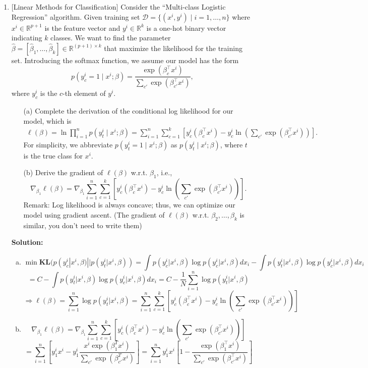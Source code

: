 \documentclass[10pt]{article}
\begin{document}
\begin{enumerate}[1.]
	\item {} [Linear Methods for Classification] 
	Consider the ``Multi-class Logistic Regression'' algorithm. Given training set 
	$\mathcal{D}=\{(x^i,y^i)\mid i=1,\ldots,n\}$ where $x^i\in \mathbb{R}^{p+1}$ is the 
	feature vector and $y^i\in \mathbb{R}^{k}$ is a one-hot binary vector indicating 
	$k$ classes. We want to find the parameter $\hat{\beta}=[\hat{\beta}_1,\ldots,\hat{\beta}_k]\in \mathbb{R}^{(p+1)\times k}$ 
	that maximize the likelihood for the training set. Introducing the softmax 
	function, we assume our model has the form 
	\[
		p(y_c^i=1\mid x^i;\beta) = \frac{\exp(\beta_c^\top x^i)}{\sum_{c'}\exp(\beta_{c'}^\top x^i)},
	\]
	where $y_c^i$ is the $c$-th element of $y^i$.
		\begin{itemize}
		\item[(a)] Complete the derivation of the conditional log likelihood for our model, which is
		\begin{align*}
			\ell(\beta) = \ln \prod_{i=1}^{n} p(y_t^i\mid x^i;\beta)
			=\sum_{i=1}^{n}\sum_{c=1}^{k}\left[ y_c^i(\beta_c^\top x^i) - y_c^i\ln \left(\sum_{c'}\exp(\beta_{c'}^\top x^i) \right)\right].
		\end{align*}
		For simplicity, we abbreviate $p(y_t^i=1\mid x^i;\beta)$ as $p(y_t^i\mid x^i;\beta)$, where 
		$t$ is the true class for $x^i$.~
		\item[(b)] Derive the gradient of $\ell(\beta)$ w.r.t. $\beta_1$, i.e., 
		\[
			\nabla_{\beta_1}\ell(\beta) = \nabla_{\beta_1} \sum_{i=1}^{n}\sum_{c=1}^{k}\left[ y_c^i(\beta_c^\top x^i) - y_c^i\ln \left(\sum_{c'}\exp(\beta_{c'}^\top x^i) \right)\right].
		\]
		Remark: Log likelihood is always concave; thus, we can optimize our model 
		using gradient ascent. (The gradient of $\ell(\beta)$ w.r.t. $\beta_2,\ldots,\beta_k$ is similar, you don't need to write them)~
		\end{itemize}
		\textbf{Solution:}
		\begin{enumerate}[(a)]
			\item 
			$$\min\mathbf{KL}(p(y_c^i|x^i,\beta)||p(y_t^i|x^i,\beta))=\int p(y_c^i|x^i,\beta)\log p(y_c^i|x^i,\beta)dx_i-\int p(y_t^i|x^i,\beta)\log p(y_c^i|x^i,\beta)dx_i$$
			$$=C-\int p(y_t^i|x^i,\beta)\log p(y_c^i|x^i,\beta)dx_i=C-\frac{1}{N}\sum_{i=1}^n\log p(y_t^i|x^i,\beta)$$
			$$\Rightarrow \ell(\beta)=\sum_{i=1}^n\log p(y_t^i|x^i,\beta)=\sum_{i=1}^{n}\sum_{c=1}^{k}\left[ y_c^i(\beta_c^\top x^i) - y_c^i\ln \left(\sum_{c'}\exp(\beta_{c'}^\top x^i) \right)\right]$$
			\item 
			$$\nabla_{\beta_1}\ell(\beta) = \nabla_{\beta_1} \sum_{i=1}^{n}\sum_{c=1}^{k}\left[ y_c^i(\beta_c^\top x^i) - y_c^i\ln \left(\sum_{c'}\exp(\beta_{c'}^\top x^i) \right)\right]$$
			$$=\sum_{i=1}^n\left[y^i_1x^i-y^i_1\frac{x^i\exp(\beta_1^Tx^i)}{\sum_{c'}\exp(\beta_{c'}^Tx^i)}\right]=\sum_{i=1}^{n} y_1^i x^i \left[1 - \frac{\exp(\beta_1^\top x^i)}{\sum_{c'}\exp(\beta_{c'}^\top x^i)}\right]$$
		\end{enumerate}
		\newpage


\end{enumerate}
\end{document}
